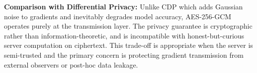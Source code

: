 \textbf{Comparison with Differential Privacy:} Unlike CDP which adds Gaussian noise to gradients and inevitably degrades model accuracy, AES-256-GCM operates purely at the transmission layer. The privacy guarantee is cryptographic rather than information-theoretic, and is incompatible with honest-but-curious server computation on ciphertext. This trade-off is appropriate when the server is semi-trusted and the primary concern is protecting gradient transmission from external observers or post-hoc data leakage.
